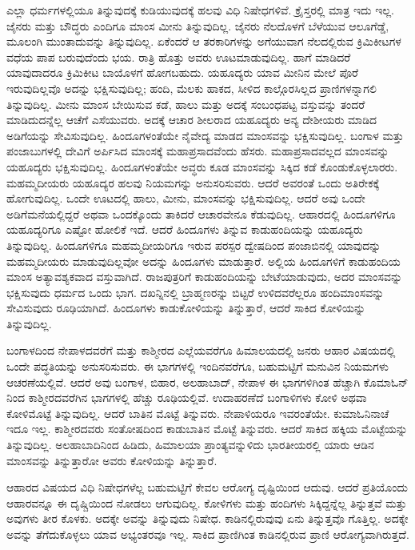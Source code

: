 ಎಲ್ಲಾ ಧರ್ಮಗಳಲ್ಲಿಯೂ ತಿನ್ನುವುದಕ್ಕೆ ಕುಡಿಯುವುದಕ್ಕೆ ಹಲವು ವಿಧಿ ನಿಷೇಧಗಳಿವೆ. ಕ್ರೈಸ್ತರಲ್ಲಿ ಮಾತ್ರ ಇದು ಇಲ್ಲ. ಜೈನರು ಮತ್ತು ಬೌದ್ಧರು ಎಂದಿಗೂ ಮಾಂಸ ಮೀನು ತಿನ್ನುವುದಿಲ್ಲ. ಜೈನರು ನೆಲದೊಳಗೆ ಬೆಳೆಯುವ ಆಲೂಗೆಡ್ಡೆ, ಮೂಲಂಗಿ ಮುಂತಾದುವನ್ನು ತಿನ್ನುವುದಿಲ್ಲ. ಏಕೆಂದರೆ ಆ ತರಕಾರಿಗಳನ್ನು ಅಗೆಯುವಾಗ ನೆಲದಲ್ಲಿರುವ ಕ್ರಿಮಿಕೀಟಗಳ ವಧೆಯ ಪಾಪ ಬರುವುದೆಂದು ಭಯ. ರಾತ್ರಿ ಹೊತ್ತು ಅವರು ಊಟಮಾಡುವುದಿಲ್ಲ. ಹಾಗೆ ಮಾಡಿದರೆ ಯಾವುದಾದರೂ ಕ್ರಿಮಿಕೀಟ ಬಾಯೊಳಗೆ ಹೋಗಬಹುದು. ಯಹೂದ್ಯರು ಯಾವ ಮೀನಿನ ಮೇಲೆ ಪೊರೆ ಇರುವುದಿಲ್ಲವೊ ಅದನ್ನು ಭಕ್ಷಿಸುವುದಿಲ್ಲ; ಹಂದಿ, ಮೆಲಕು ಹಾಕದ, ಸೀಳಿದ ಕಾಲ್ಗೊರಸಿಲ್ಲದ ಪ್ರಾಣಿಗಳನ್ನಾಗಲಿ ತಿನ್ನುವುದಿಲ್ಲ. ಮೀನು ಮಾಂಸ ಬೇಯಿಸುವ ಕಡೆ, ಹಾಲು ಮತ್ತು ಅದಕ್ಕೆ ಸಂಬಂಧಪಟ್ಟ ವಸ್ತುವನ್ನು ತಂದರೆ ಮಾಡಿದುದನ್ನೆಲ್ಲ ಆಚೆಗೆ ಎಸೆಯುವರು. ಅದಕ್ಕೆ ಆಚಾರ ಶೀಲರಾದ ಯಹೂದ್ಯರು ಅನ್ಯ ದೇಶೀಯರು ಮಾಡಿದ ಅಡಿಗೆಯನ್ನು ಸೇವಿಸುವುದಿಲ್ಲ. ಹಿಂದೂಗಳಂತೆಯೇ ನೈವೇದ್ಯ ಮಾಡದ ಮಾಂಸವನ್ನು ಭಕ್ಷಿಸುವುದಿಲ್ಲ. ಬಂಗಾಳ ಮತ್ತು ಪಂಜಾಬುಗಳಲ್ಲಿ ದೇವಿಗೆ ಅರ್ಪಿಸಿದ ಮಾಂಸಕ್ಕೆ ಮಹಾಪ್ರಸಾದವೆಂದು ಹೆಸರು. ಮಹಾಪ್ರಸಾದವಲ್ಲದ ಮಾಂಸವನ್ನು ಯಹೂದ್ಯರು ಭಕ್ಷಿಸುವುದಿಲ್ಲ. ಹಿಂದೂಗಳಂತೆಯೇ ಅವ್ಧರು ಕೂಡ ಮಾಂಸವನ್ನು ಸಿಕ್ಕಿದ ಕಡೆ ಕೊಂಡುಕೊಳ್ಳಲಾರರು. ಮಹಮ್ಮದೀಯರು ಯಹೂದ್ಯರ ಹಲವು ನಿಯಮಗನ್ನು ಅನುಸರಿಸುವರು. ಆದರೆ ಅವರಂತೆ ಒಂದು ಅತಿರೇಕಕ್ಕೆ ಹೋಗುವುದಿಲ್ಲ. ಒಂದೇ ಊಟದಲ್ಲಿ ಹಾಲು, ಮೀನು, ಮಾಂಸವನ್ನು ಭಕ್ಷಿಸುವುದಿಲ್ಲ. ಆದರೆ ಅವು ಒಂದೇ ಅಡಿಗೆಮನೆಯಲ್ಲಿದ್ದರೆ ಅಥವಾ ಒಂದಕ್ಕೊಂದು ತಾಕಿದರೆ ಆಚಾರವೇನೂ ಕೆಡುವುದಿಲ್ಲ. ಆಹಾರದಲ್ಲಿ ಹಿಂದೂಗಳಿಗೂ ಯಹೂದ್ಯರಿಗೂ ಎಷ್ಟೋ ಹೋಲಿಕೆ ಇದೆ. ಆದರೆ ಹಿಂದೂಗಳು ತಿನ್ನುವ ಕಾಡುಹಂದಿಯನ್ನು ಯಹೂದ್ಯರು ತಿನ್ನುವುದಿಲ್ಲ. ಹಿಂದೂಗಳಿಗೂ ಮಹಮ್ಮದೀಯರಿಗೂ ಇರುವ ಪರಸ್ಪರ ದ್ವೇಷದಿಂದ ಪಂಜಾಬಿನಲ್ಲಿ ಯಾವುದನ್ನು ಮಹಮ್ಮದೀಯರು ಮಾಡುವುದಿಲ್ಲವೋ ಅದನ್ನು ಹಿಂದೂಗಳು ಮಾಡುತ್ತಾರೆ. ಅಲ್ಲಿಯ ಹಿಂದೂಗಳಿಗೆ ಕಾಡುಹಂದಿಯ ಮಾಂಸ ಅತ್ಯಾವಶ್ಯಕವಾದ ವಸ್ತುವಾಗಿದೆ. ರಾಜಪುತ್ರರಿಗೆ ಕಾಡುಹಂದಿಯನ್ನು ಬೇಟೆಯಾಡುವುದು, ಅದರ ಮಾಂಸವನ್ನು ಭಕ್ಷಿಸುವುದು ಧರ್ಮದ ಒಂದು ಭಾಗ. ದಖನ್ನಿನಲ್ಲಿ ಬ್ರಾಹ್ಮಣರನ್ನು ಬಿಟ್ಟರೆ ಉಳಿದವರೆಲ್ಲರೂ ಹಂದಿಮಾಂಸವನ್ನು ಸೇವಿಸುವುದು ರೂಢಿಯಾಗಿದೆ. ಹಿಂದೂಗಳು ಕಾಡುಕೋಳಿಯನ್ನು ತಿನ್ನುತ್ತಾರೆ, ಆದರೆ ಸಾಕಿದ ಕೋಳಿಯನ್ನು ತಿನ್ನುವುದಿಲ್ಲ.

ಬಂಗಾಳದಿಂದ ನೇಪಾಳದವರೆಗೆ ಮತ್ತು ಕಾಶ್ಮೀರದ ಎಲ್ಲೆಯವರೆಗೂ ಹಿಮಾಲಯದಲ್ಲಿ ಜನರು ಆಹಾರ ವಿಷಯದಲ್ಲಿ ಒಂದೇ ಪದ್ಧತಿಯನ್ನು ಅನುಸರಿಸುವರು. ಈ ಭಾಗಗಳಲ್ಲಿ ಇಂದಿನವರೆಗೂ, ಬಹುಮಟ್ಟಿಗೆ ಮನುವಿನ ನಿಯಮಗಳು ಆಚರಣೆಯಲ್ಲಿವೆ. ಆದರೆ ಅವು ಬಂಗಾಳ, ಬಿಹಾರ, ಅಲಹಾಬಾದ್​, ನೇಪಾಳ ಈ ಭಾಗಗಳಿಗಿಂತ ಹೆಚ್ಚಾಗಿ ಕೊಮಾಓನ್​ನಿಂದ ಕಾಶ್ಮೀರದವರೆಗಿನ ಭಾಗಗಳಲ್ಲಿ ಹೆಚ್ಚು ರೂಢಿಯಲ್ಲಿವೆ. ಉದಾಹರಣೆದೆ ಬಂಗಾಳಿಗಳು ಕೋಳಿ ಅಥವಾ ಕೋಳಿಮೊಟ್ಟೆ ತಿನ್ನುವುದಿಲ್ಲ. ಆದರೆ ಬಾತಿನ ಮೊಟ್ಟೆ ತಿನ್ನುವರು. ನೇಪಾಳಿಯರೂ ಇವರಂತೆಯೇ. ಕುಮಾಓನಿನಾಚೆ ಇದೂ ಇಲ್ಲ. ಕಾಶ್ಮೀರದವರು ಸಂತೋಷದಿಂದ ಕಾಡುಬಾತಿನ ಮೊಟ್ಟೆ ತಿನ್ನುವರು. ಆದರೆ ಸಾಕಿದ ಹಕ್ಕಿಯ ಮೊಟ್ಟೆಯನ್ನು ತಿನ್ನುವುದಿಲ್ಲ. ಅಲಹಾಬಾದಿನಿಂದ ಹಿಡಿದು, ಹಿಮಾಲಯಾ ಪ್ರಾಂತ್ಯವನ್ನುಳಿದು ಭಾರತೀಯರಲ್ಲಿ ಯಾರು ಆಡಿನ ಮಾಂಸವನ್ನು ತಿನ್ನುತ್ತಾರೋ ಅವರು ಕೋಳಿಯನ್ನು ತಿನ್ನುತ್ತಾರೆ.

ಆಹಾರದ ವಿಷಯದ ವಿಧಿ ನಿಷೇಧಗಳೆಲ್ಲ ಬಹುಮಟ್ಟಿಗೆ ಕೇವಲ ಆರೋಗ್ಯ ದೃಷ್ಟಿಯಿಂದ ಆದುವು. ಆದರೆ ಪ್ರತಿಯೊಂದು ಆಹಾರವನ್ನೂ ಈ ದೃಷ್ಚಿಯಿಂದ ನೋಡಲು ಆಗುವುದಿಲ್ಲ. ಕೋಳಿಗಳು ಮತ್ತು ಹಂದಿಗಳು ಸಿಕ್ಕಿದ್ದನ್ನೆಲ್ಲ ತಿನ್ನುತ್ತವೆ ಮತ್ತು ಅವುಗಳು ತೀರ ಕೊಳಕು. ಅದಕ್ಕೇ ಅವನ್ನು ತಿನ್ನುವುದು ನಿಷೇಧ. ಕಾಡಿನಲ್ಲಿರುವುವು ಏನು ತಿನ್ನುತ್ತವೊ ಗೊತ್ತಿಲ್ಲ. ಅದಕ್ಕೇ ಅವನ್ನು ತೆಗೆದುಕೊಳ್ಳಲು ಯಾವ ಅಭ್ಯಂತರವೂ ಇಲ್ಲ. ಸಾಕಿದ ಪ್ರಾಣಿಗಿಂತ ಕಾಡಿನಲ್ಲಿರುವ ಪ್ರಾಣಿ ಆರೋಗ್ಯವಾಗಿರುತ್ತದೆ.

